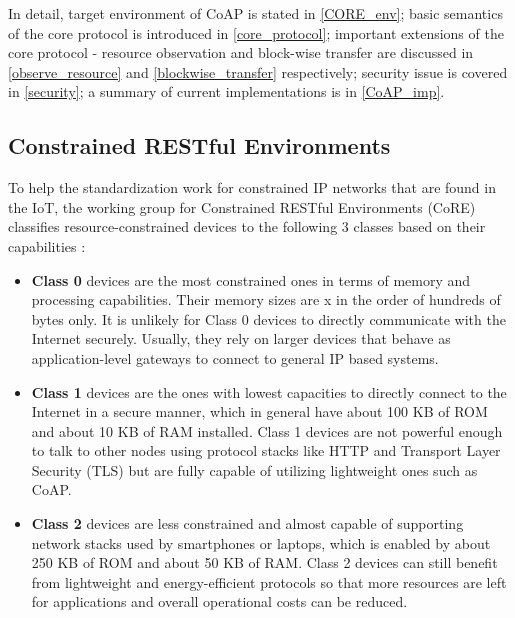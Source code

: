 In detail, target environment of CoAP is stated in \autoref{CORE_env}; basic semantics of the core protocol is introduced in \autoref{core_protocol}; important extensions of the core protocol - resource observation and block-wise transfer are discussed in \autoref{observe_resource} and \autoref{blockwise_transfer} respectively; security issue is covered in \autoref{security}; a summary of current implementations is in \autoref{CoAP_imp}.

\subsection{Constrained RESTful Environments} \label{CORE_env}

To help the standardization work for constrained IP networks that are found in the IoT, the working group for Constrained RESTful Environments (CoRE) classifies resource-constrained devices to the following 3 classes based on their capabilities \autocite{constarined_env}: 

\begin{itemize}

\item \textbf{Class 0} devices are the most constrained ones in terms of memory and processing capabilities. Their memory sizes are x in the order of hundreds of bytes only. It is unlikely for Class 0 devices to directly communicate with the Internet securely. Usually, they rely on larger devices that behave as application-level gateways to connect to general IP based systems. 

\item \textbf{Class 1} devices are the ones with lowest capacities to directly connect to the Internet in a secure manner, which in general have about 100 KB of ROM and about 10 KB of RAM installed. Class 1 devices are not powerful enough to talk to other nodes using protocol stacks like HTTP and Transport Layer Security (TLS) but are fully capable of utilizing lightweight ones such as CoAP. 

\item \textbf{Class 2} devices are less constrained and almost capable of supporting network stacks used by smartphones or laptops, which is enabled by about 250 KB of ROM and about 50 KB of RAM. Class 2 devices can still benefit from lightweight and energy-efficient protocols so that more resources are left for applications and overall operational costs can be reduced. 

\end{itemize}

